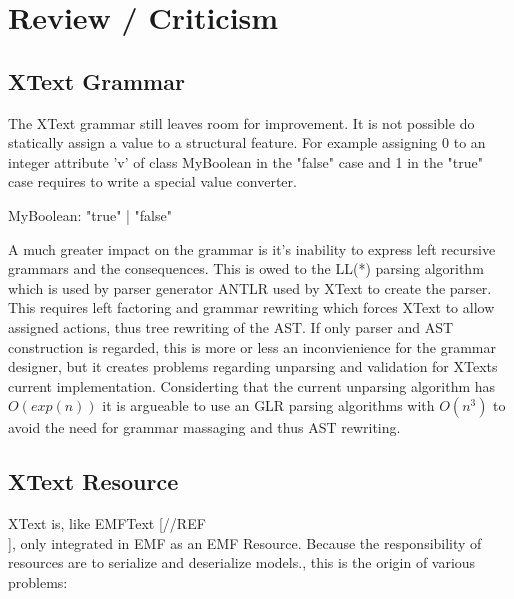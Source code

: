 \section{Review / Criticism}
\subsection{XText Grammar}
The XText grammar still leaves room for improvement. It is not possible do statically assign a value  to a structural feature. For example assigning 0 to an integer attribute 'v' of class MyBoolean in the "false" case and 1 in the "true" case requires to write a special value converter. 
\begin{xtxt}
MyBoolean:  "true" | "false"
\end{xtxt}

A much greater impact on the grammar is it's inability to express left recursive grammars and the consequences. This is owed to the LL(*) parsing algorithm which is used by parser generator ANTLR used by XText to create the parser. This requires left factoring and grammar rewriting which forces XText to allow assigned actions, thus tree rewriting of the AST. If only parser and AST construction is regarded, this is more or less an inconvienience for the grammar designer, but it creates problems regarding unparsing and validation for XTexts current implementation. Considerting that the current unparsing algorithm has $O(exp(n))$ it is argueable to use an GLR parsing algorithms with  $O(n^3)$ to avoid the need for grammar massaging and thus AST rewriting.

\subsection{XText Resource}
XText is, like EMFText [//REF\\], only integrated in EMF as an EMF Resource. Because the responsibility of resources are to serialize and deserialize models., this is the origin of various problems: 

